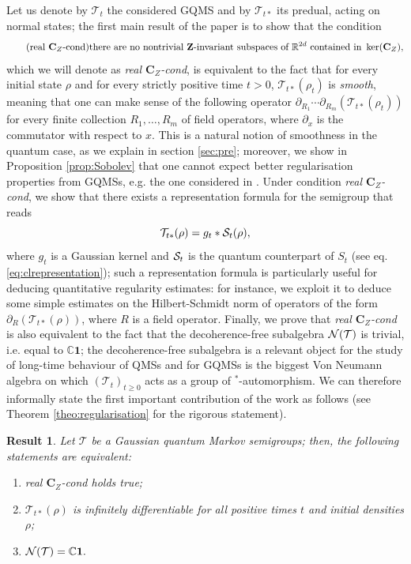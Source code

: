 \documentclass[preprint]{elsarticle}
\newtheorem{result}[defi]{Result}
\theoremstyle{definition}
\def\CC{\mathbb{C}}
\def\RR{\mathbb{R}}
\def\TT{\mathcal{T}}
\begin{document}
Let us denote by $\TT_t$ the considered GQMS and by $\TT_{t*}$ its predual, acting on normal states; the first main result of the paper is to show that the condition
\begin{equation} \label{eq:realCzcond} \tag{real $\mathbf{C}_Z$-cond}\text{there are no nontrivial $\mathbf{Z}$-invariant subspaces of } \RR^{2d} \text{ contained in } \ker(\mathbf{C}_{Z}),\end{equation}
which we will denote as \textit{real $\textbf{C}_{Z}$-cond}, is equivalent to the fact that for every initial state $\rho$ and for every strictly positive time $t>0$, $\TT_{t*}(\rho_t)$ is \textit{smooth}, meaning that one can make sense of the following operator $\partial_{R_1}\cdots \partial_{R_m}(\TT_{t*}(\rho_t))$ for every finite collection $R_1,\dots, R_m$ of field operators, where $\partial_{x}$ is the commutator with respect to $x$. This is a natural notion of smoothness in the quantum case, as we explain in section \ref{sec:pre}; moreover, we show in Proposition \ref{prop:Sobolev} that one cannot expect better regularisation properties from GQMSs, e.g. the one considered in \cite{RGM25}. Under condition \textit{real $\textbf{C}_{Z}$-cond}, we show that there exists a representation formula for the semigroup that reads
\begin{equation}\label{eq:convo}
\TT_{t*}(\rho)=g_t*{\cal S}_t(\rho),\end{equation}
where $g_t$ is a Gaussian kernel and ${\cal S}_t$ is the quantum counterpart of $S_t$ (see eq.\eqref{eq:clrepresentation}); such a representation formula is particularly useful for deducing quantitative regularity estimates: for instance, we exploit it to deduce some simple estimates on the Hilbert-Schmidt norm of operators of the form $\partial_R(\TT_{t*}(\rho))$, where $R$ is a field operator. Finally, we prove that \textit{real $\textbf{C}_{Z}$-cond} is also equivalent to the fact that the decoherence-free subalgebra ${\cal N}(\TT)$ is trivial, i.e. equal to $\CC\mathbf{1}$; the decoherence-free subalgebra is a relevant object for the study of long-time behaviour of QMSs and for GQMSs is the biggest Von Neumann algebra on which $(\TT_t)_{t \geq 0}$ acts as a group of $^*$-automorphism. We can therefore informally state the first important contribution of the work as follows (see Theorem \ref{theo:regularisation} for the rigorous statement).

\begin{result}
Let $\TT$ be a Gaussian quantum Markov semigroups; then, the following statements are equivalent:
\begin{enumerate}
    \item real $\mathbf{C}_Z$-cond holds true;
    \item $\TT_{t*}(\rho)$ is infinitely differentiable for all positive times $t$ and initial densities $\rho$;
    \item ${\cal N}(\TT)=\CC \mathbf{1}.$
\end{enumerate}
\end{result}
\end{document}
